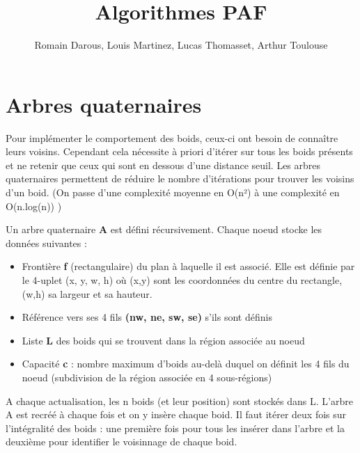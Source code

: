 \documentclass{article}
\title{Algorithmes PAF}
\author{Romain Darous, Louis Martinez, Lucas Thomasset, Arthur Toulouse}
\begin{document}
\maketitle

\section{Arbres quaternaires}

Pour implémenter le comportement des boids, ceux-ci ont besoin de connaître leurs voisins.
Cependant cela nécessite à priori d’itérer sur tous les boids présents et ne retenir que ceux qui sont en dessous
d’une distance seuil. Les arbres quaternaires permettent de réduire le nombre d’itérations
pour trouver les voisins d’un boid. (On passe d’une complexité moyenne en O(n²) à une
complexité en O(n.log(n)) )

\medbreak
Un arbre quaternaire \textbf{A} est défini récursivement. Chaque noeud stocke les données suivantes :
\begin{itemize}
    \item Frontière \textbf{f} (rectangulaire) du plan à laquelle il est associé. Elle est définie par le 4-uplet (x, y, w, h) où  (x,y) sont les coordonnées du centre du rectangle, (w,h) sa largeur et sa hauteur.
    \item Référence vers ses 4 fils \textbf{(nw, ne, sw, se)} s’ils sont définis
    \item Liste \textbf{L} des boids qui se trouvent dans la région associée au noeud
    \item Capacité \textbf{c} : nombre maximum d’boids au-delà duquel on définit les 4 fils du noeud (subdivision de la région associée en 4 sous-régions)
\end{itemize}


A chaque actualisation, les n boids (et leur position) sont stockés dans L.
L’arbre A est recréé à chaque fois et on y insère chaque boid.
Il faut itérer deux fois sur l’intégralité des boids : une première fois pour tous les
insérer dans l’arbre et la deuxième pour identifier le voisinnage de chaque boid.
\end{document}
